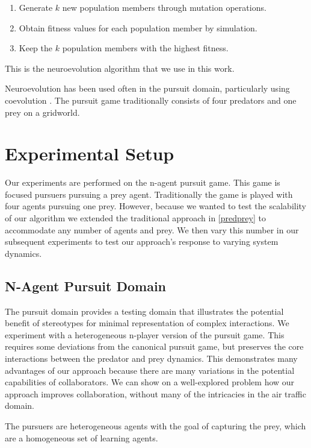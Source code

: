 \documentclass{aamas2014}
\begin{document}
\begin{enumerate}
\item Generate $k$ new population members through mutation operations.
\item Obtain fitness values for each population member by simulation.
\item Keep the $k$ population members with the highest fitness.
\end{enumerate}

This is the neuroevolution algorithm that we use in this work.

Neuroevolution has been used often in the pursuit domain, particularly using coevolution \cite{panait,otherpursuitpaper}. The pursuit game traditionally consists of four predators and one prey on a gridworld.

\section{Experimental Setup}
\label{sec:experimental}

Our experiments are performed on the n-agent pursuit game. This game is focused pursuers pursuing a prey agent. Traditionally the game is played with four agents pursuing one prey. However, because we wanted to test the scalability of our algorithm we extended the traditional approach in \ref{predprey} to accommodate any number of agents and prey. We then vary this number in our subsequent experiments to test our approach's response to varying system dynamics.


\subsection{N-Agent Pursuit Domain}

The pursuit domain provides a testing domain that illustrates the potential benefit of stereotypes for minimal representation of complex interactions. We experiment with a heterogeneous n-player version of the pursuit game. This requires some deviations from the canonical pursuit game, but preserves the core interactions between the predator and prey dynamics. This demonstrates many advantages of our approach because there are many variations in the potential capabilities of collaborators. We can show on a well-explored problem how our approach improves collaboration, without many of the intricacies in the air traffic domain.

The pursuers are heterogeneous agents with the goal of capturing the prey, which are a homogeneous set of learning agents.
\end{document}
